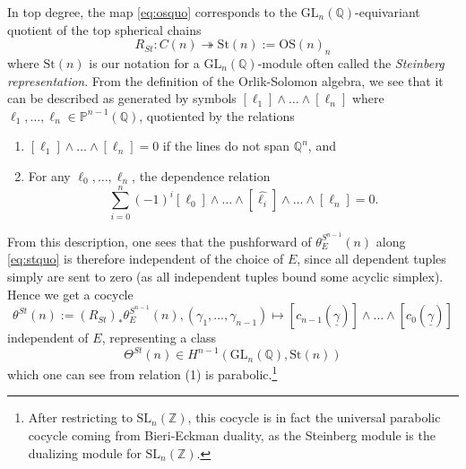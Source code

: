 \documentclass[10pt]{amsart}
\theoremstyle{definition}
\newcommand{\Q}{\mathbb{Q}}
\newcommand{\St}{\mathrm{St}}
\newcommand{\OS}{\mathrm{OS}}
\newcommand{\GL}{\mathrm{GL}}
\numberwithin{equation}{section}
\begin{document}
    In top degree, the map \eqref{eq:osquo} corresponds to the $\mathrm{GL}_n(\mathbb{Q})$-equivariant quotient of the top spherical chains
    \begin{equation} \label{eq:stquo}
    R_{St}:C(n) \twoheadrightarrow \St(n):=\OS(n)_n
    \end{equation}
    where $\St(n)$ is our notation for a $\GL_n(\Q)$-module often called the \emph{Steinberg representation}. From the definition of the Orlik-Solomon algebra, we see that it can be described as generated by symbols $[\ell_1]\wedge \ldots \wedge[\ell_{n}]$ where $\ell_1,\ldots, \ell_n\in \mathbb{P}^{n-1}(\mathbb{Q})$, quotiented by the relations
    \begin{enumerate}
        \item $[\ell_1]\wedge \ldots \wedge [\ell_{n}]=0$ if the lines do not span $\mathbb{Q}^n$, and
        \item For any $\ell_0,\ldots, \ell_n$, the dependence relation \[
        \sum_{i=0}^n (-1)^i [\ell_0]\wedge \ldots \wedge  [\hat{\ell_i}] \wedge \ldots \wedge[\ell_n] = 0.
        \]
    \end{enumerate}
    From this description, one sees that the pushforward of $\theta_E^{S^{n-1}}(n)$ along \eqref{eq:stquo} is therefore independent of the choice of $E$, since all dependent tuples simply are sent to zero (as all independent tuples bound some acyclic simplex). Hence we get a cocycle 
    \[
    \theta^{St}(n):=(R_{St})_*\theta_E^{S^{n-1}}(n), (\gamma_1,\ldots, \gamma_{n-1})\mapsto [c_{n-1}(\underline{\gamma})] \wedge \ldots \wedge [c_0(\underline{\gamma})]
    \]
    independent of $E$, representing a class
    \[
    \Theta^{St}(n)\in H^{n-1}(\mathrm{GL}_n(\mathbb{Q}), \St(n))
    \]
    which one can see from relation (1) is parabolic.\footnote{After restricting to $\mathrm{SL}_n(\mathbb{Z})$, this cocycle is in fact the universal parabolic cocycle coming from Bieri-Eckman duality, as the Steinberg module is the dualizing module for $\mathrm{SL}_n(\mathbb{Z})$.} 
    
\end{document}
